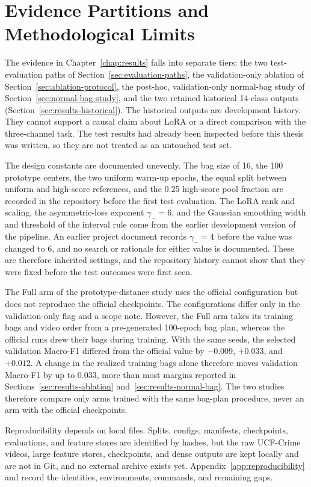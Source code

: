 \section{Evidence Partitions and Methodological Limits}
\label{sec:method-limits}

The evidence in Chapter~\ref{chap:results} falls into separate tiers: the two test-evaluation paths of Section~\ref{sec:evaluation-paths}, the validation-only ablation of Section~\ref{sec:ablation-protocol}, the post-hoc, validation-only normal-bag study of Section~\ref{sec:normal-bag-study}, and the two retained historical 14-class outputs (Section~\ref{sec:results-historical}). The historical outputs are development history. They cannot support a causal claim about LoRA or a direct comparison with the three-channel task. The test results had already been inspected before this thesis was written, so they are not treated as an untouched test set.

The design constants are documented unevenly. The bag size of 16, the 100 prototype centers, the two uniform warm-up epochs, the equal split between uniform and high-score references, and the 0.25 high-score pool fraction are recorded in the repository before the first test evaluation. The LoRA rank and scaling, the asymmetric-loss exponent $\gamma_-=6$, and the Gaussian smoothing width and threshold of the interval rule come from the earlier development version of the pipeline. An earlier project document records $\gamma_-=4$ before the value was changed to 6, and no search or rationale for either value is documented. These are therefore inherited settings, and the repository history cannot show that they were fixed before the test outcomes were first seen.

The Full arm of the prototype-distance study uses the official configuration but does not reproduce the official checkpoints. The configurations differ only in the validation-only flag and a scope note. However, the Full arm takes its training bags and video order from a pre-generated 100-epoch bag plan, whereas the official runs drew their bags during training. With the same seeds, the selected validation Macro-F1 differed from the official value by $-0.009$, $+0.033$, and $+0.012$. A change in the realized training bags alone therefore moves validation Macro-F1 by up to 0.033, more than most margins reported in Sections~\ref{sec:results-ablation} and~\ref{sec:results-normal-bag}. The two studies therefore compare only arms trained with the same bag-plan procedure, never an arm with the official checkpoints.

Reproducibility depends on local files. Splits, configs, manifests, checkpoints, evaluations, and feature stores are identified by hashes, but the raw UCF-Crime videos, large feature stores, checkpoints, and dense outputs are kept locally and are not in Git, and no external archive exists yet. Appendix~\ref{app:reproducibility} and  record the identities, environments, commands, and remaining gaps.
